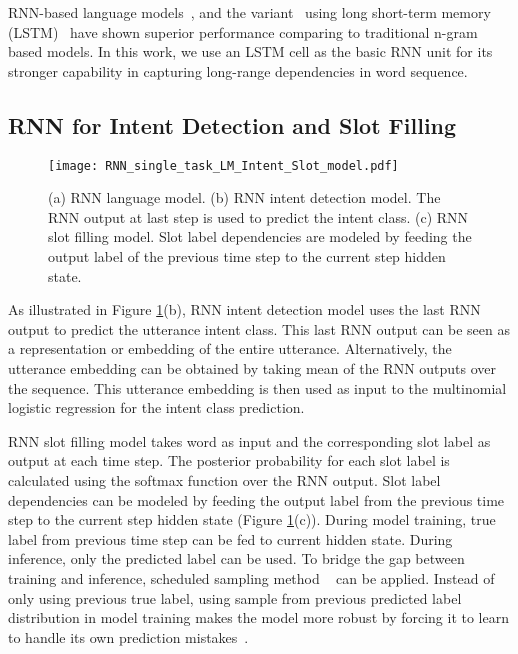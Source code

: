 \documentclass[11pt]{article}
\begin{document}
    RNN-based language models~\cite{mikolov:11}, and the variant~\cite{sundermeyer:12} using long short-term memory (LSTM)~\cite{hochreiter:97} have shown superior performance comparing to traditional n-gram based models. In this work, we use an LSTM cell as the basic RNN unit for its stronger capability in capturing long-range dependencies in word sequence. 

\begin{comment}
### Hide this comment part ###
    LSTM model replaces the recurrent module that uses sigmoid or hyperbolic tangent activation function in basic RNN with memory block. Memory block may contain one or more memory cells. The cell state contains summarized information of previous observations, the propagation of which is regulated by cell gates. 
      
    where ,  and  are the forget gate, input gate and output gate respectively.  is the cell state, and  is the cell output. Figure 2(a) illustrates the architecture of the RNN language model. 
\end{comment}

\subsection{RNN for Intent Detection and Slot Filling}
    \begin{figure}[t]
        \centering
        \texttt{[image: RNN\_single\_task\_LM\_Intent\_Slot\_model.pdf]}
        \caption{{(a) RNN language model. (b) RNN intent detection model. The RNN output at last step is used to predict the intent class. (c) RNN slot filling model. Slot label dependencies are modeled by feeding the output label of the previous time step to the current step hidden state. }}
        \label{fig:RNN_single_task_LM_Intent_Slot_model}
    \end{figure}
    As illustrated in Figure \ref{fig:RNN_single_task_LM_Intent_Slot_model}(b), RNN intent detection model uses the last RNN output to predict the utterance intent class. This last RNN output can be seen as a representation or embedding of the entire utterance. Alternatively, the utterance embedding can be obtained by taking mean of the RNN outputs over the sequence. This utterance embedding is then used as input to the multinomial logistic regression for the intent class prediction.

    RNN slot filling model takes word as input and the corresponding slot label as output at each time step. The posterior probability for each slot label is calculated using the softmax function over the RNN output. Slot label dependencies can be modeled by feeding the output label from the previous time step to the current step hidden state (Figure \ref{fig:RNN_single_task_LM_Intent_Slot_model}(c)). During model training, true label from previous time step can be fed to current hidden state. During inference, only the predicted label can be used. To bridge the gap between training and inference, scheduled sampling method ~\cite{bengio:15} can be applied. Instead of only using previous true label, using sample from previous predicted label distribution in model training makes the model more robust by forcing it to learn to handle its own prediction mistakes~\cite{liu:15}.
\end{document}
